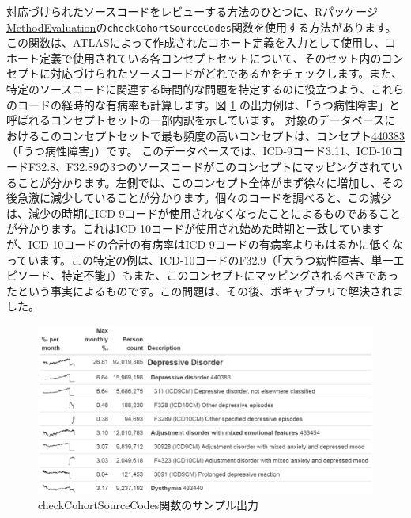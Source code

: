 \documentclass[
  11pt]{book}
\theoremstyle{definition}
\theoremstyle{definition}
\theoremstyle{definition}
\theoremstyle{definition}
\theoremstyle{remark}
\begin{document}
対応づけられたソースコードをレビューする方法のひとつに、Rパッケージ\href{https://ohdsi.github.io/MethodEvaluation/}{MethodEvaluation}の\texttt{checkCohortSourceCodes}関数を使用する方法があります。この関数は、ATLASによって作成されたコホート定義を入力として使用し、コホート定義で使用されている各コンセプトセットについて、そのセット内のコンセプトに対応づけられたソースコードがどれであるかをチェックします。また、特定のソースコードに関連する時間的な問題を特定するのに役立つよう、これらのコードの経時的な有病率も計算します。図 \ref{fig:sourceCodes} の出力例は、「うつ病性障害」と呼ばれるコンセプトセットの一部内訳を示しています。 対象のデータベースにおけるこのコンセプトセットで最も頻度の高いコンセプトは、コンセプト\href{http://athena.ohdsi.org/search-terms/terms/440383}{440383}（「うつ病性障害」）です。 このデータベースでは、ICD-9コード3.11、ICD-10コードF32.8、F32.89の3つのソースコードがこのコンセプトにマッピングされていることが分かります。左側では、このコンセプト全体がまず徐々に増加し、その後急激に減少していることが分かります。個々のコードを調べると、この減少は、減少の時期にICD-9コードが使用されなくなったことによるものであることが分かります。これはICD-10コードが使用され始めた時期と一致していますが、ICD-10コードの合計の有病率はICD-9コードの有病率よりもはるかに低くなっています。この特定の例は、ICD-10コードのF32.9（「大うつ病性障害、単一エピソード、特定不能」）もまた、このコンセプトにマッピングされるべきであったという事実によるものです。この問題は、その後、ボキャブラリで解決されました。

\begin{figure}

{\centering \includegraphics[width=1\linewidth]{images/DataQuality/sourceCodes} 

}

\caption{checkCohortSourceCodes関数のサンプル出力}\label{fig:sourceCodes}
\end{figure}
\end{document}
